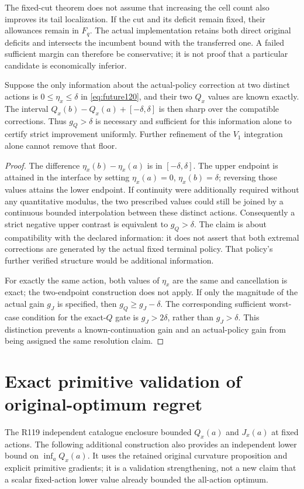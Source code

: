 The fixed-cut theorem does not assume that increasing the cell count
also improves its tail localization.  If the cut and its deficit
remain fixed, their allowances remain in $F_q$.  The actual
implementation retains both direct original deficits and
intersects the incumbent bound with the transferred one.
A failed
sufficient margin can therefore be conservative; it is not proof
that a particular candidate is economically inferior.

\begin{proposition}
\label{prop:futurefloor120}
Suppose the only information about the actual-policy correction at
two distinct actions is $0\le\eta_x\le\delta$ in
\eqref{eq:future120}, and their two $Q_x$ values are known
exactly.  The interval
$Q_x(b)-Q_x(a)+[-\delta,\delta]$ is then sharp over the
compatible corrections.  Thus $g_Q>\delta$ is necessary
and sufficient for this information alone to certify strict
improvement uniformly.  Further refinement of the $V_1$
integration alone cannot remove that floor.
\end{proposition}

\begin{proof}
The difference $\eta_x(b)-\eta_x(a)$ is in
$[-\delta,\delta]$.
The upper endpoint is attained in the interface by setting
$\eta_x(a)=0$, $\eta_x(b)=\delta$; reversing those values
attains the lower endpoint.  If continuity were additionally
required without any quantitative modulus, the two prescribed
values could still be joined by a continuous bounded
interpolation between these distinct actions.
Consequently a strict negative upper contrast is equivalent
to $g_Q>\delta$.  The claim is about compatibility with the
declared information: it does not assert that both extremal
corrections are generated by the actual fixed terminal policy.
That policy's further verified structure would be additional
information.

For exactly the same action, both values of $\eta_x$ are the
same and cancellation is exact; the two-endpoint construction
does not apply.  If only the magnitude of the actual gain
$g_J$ is specified, then $g_Q\ge g_J-\delta$.
The corresponding sufficient worst-case condition for the
exact-$Q$ gate is $g_J>2\delta$, rather than $g_J>\delta$.
This distinction prevents a known-continuation gain and an
actual-policy gain from being assigned the same resolution
claim.
\end{proof}

\section{Exact primitive validation of original-optimum regret}
\label{supp:independentopt120}
The R119 independent catalogue enclosure bounded $Q_x(a)$ and
$J_x(a)$ at fixed actions.  The following additional construction
also provides an independent lower bound on $\inf_a Q_x(a)$.
It uses the retained original curvature proposition and explicit
primitive gradients; it is a validation strengthening, not a
new claim that a scalar fixed-action lower value already
bounded the all-action optimum.

